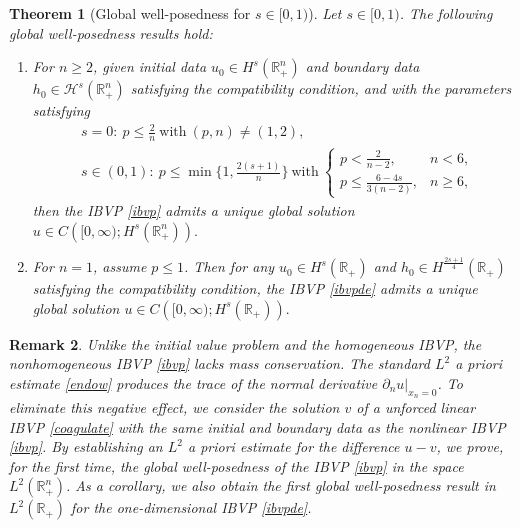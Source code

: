 \documentclass[preprint,compress,12pt]{elsarticle}
\newtheorem{theorem}{Theorem}[section]
\newtheorem{remark}[theorem]{Remark}
\numberwithin{equation}{section}
\begin{document}
\begin{theorem}[Global well-posedness for $s \in [0, 1)$]\label{new L2}	
Let $s \in [0, 1)$. The following global well-posedness results hold:
\begin{enumerate}[label=(\roman*)]
	\item For $n\geq 2$, given initial data $u_{0}\in H^{s}(\mathbb{R}^{n}_{+})$ and boundary data   $h_{0}\in\mathcal{H}^{s}(\mathbb{R}^{n}_{+})$ satisfying the compatibility condition, and with the parameters satisfying
\begin{equation*}
\begin{aligned}
	& s = 0: \ p \leq \tfrac{2}{n} \ \text{with} \ (p,n)
	\neq (1, 2), \\
	& s \in (0, 1): \  p \leq \min\{1, \tfrac{2(s+1)}{n}\} \ \text{with} \
	\begin{cases}
		p < \frac{2}{n-2}, & n < 6, \\
		p \leq \frac{6-4s}{3(n-2)}, & n \geq 6,
	\end{cases}
\end{aligned}
\end{equation*}
then the IBVP \eqref{ibvp} admits a unique global solution
$u\in C\left([0,\infty);H^{s}(\mathbb{R}^{n}_{+})\right).$
\item  For $n=1$, assume $p\leq1$.  Then for any $u_{0}\in H^{s}(\mathbb{R}_{+})$ and $h_{0}\in H^{\frac{2s+1}{4}}(\mathbb{R}_{+})$ satisfying the compatibility condition,
the IBVP \eqref{ibvpde} admits a unique global solution $	u\in C\left([0,\infty);H^{s}(\mathbb{R}_{+})\right).$
\end{enumerate}
\end{theorem}
\begin{remark}
	Unlike the initial value problem and the homogeneous IBVP,  the nonhomogeneous IBVP \eqref{ibvp} lacks mass conservation. 	The standard $L^{2}$ a priori estimate \eqref{endow} produces  the trace of the normal derivative $\partial_{n}u|_{x_{n}=0}$. To eliminate this negative effect,  we consider the solution $v$ of a unforced linear IBVP \eqref{coagulate} with the same initial and boundary data as the nonlinear IBVP \eqref{ibvp}. By  establishing an $L^{2}$ a priori estimate for the  difference  $u-v$, we prove,   for the first time, the global well-posedness of the IBVP \eqref{ibvp} in the space  $L^{2}(\mathbb{R}_+^n)$.  As a corollary, we also obtain the first global well-posedness result in   $L^{2}(\mathbb{R}_+)$ for the one-dimensional IBVP \eqref{ibvpde}.	
\end{remark}
\end{document}
